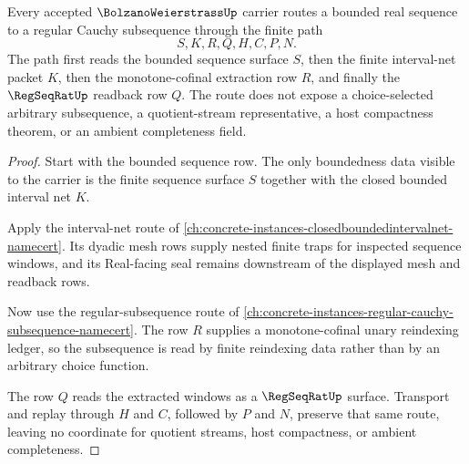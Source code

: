 \begin{theorem}
\label{thm:bolzano-weierstrass-regular-subsequence-route}
Every accepted $\BolzanoWeierstrassUp$ carrier routes a bounded real sequence to a regular Cauchy subsequence through the finite path
$$
S,K,R,Q,H,C,P,N.
$$
The path first reads the bounded sequence surface $S$, then the finite interval-net packet $K$, then the monotone-cofinal extraction row $R$, and finally the $\RegSeqRatUp$ readback row $Q$. The route does not expose a choice-selected arbitrary subsequence, a quotient-stream representative, a host compactness theorem, or an ambient completeness field.
\end{theorem}
\begin{proof}
Start with the bounded sequence row. The only boundedness data visible to the carrier is the finite sequence surface $S$ together with the closed bounded interval net $K$.

Apply the interval-net route of \autoref{ch:concrete-instances-closedboundedintervalnet-namecert}. Its dyadic mesh rows supply nested finite traps for inspected sequence windows, and its Real-facing seal remains downstream of the displayed mesh and readback rows.

Now use the regular-subsequence route of \autoref{ch:concrete-instances-regular-cauchy-subsequence-namecert}. The row $R$ supplies a monotone-cofinal unary reindexing ledger, so the subsequence is read by finite reindexing data rather than by an arbitrary choice function.

The row $Q$ reads the extracted windows as a $\RegSeqRatUp$ surface. Transport and replay through $H$ and $C$, followed by $P$ and $N$, preserve that same route, leaving no coordinate for quotient streams, host compactness, or ambient completeness.
\end{proof}

